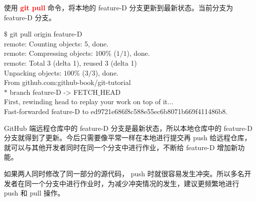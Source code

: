 \documentclass[12pt,a4paper]{article}
\begin{document}
使用  \textcolor{red}{\bf git pull} 命令，将本地的 feature-D 分支更新到最新状态。当前分支为 feature-D 分支。
\begin{tcolorbox}[colback=green!5,colframe=green!40!black,title= ]
$\$$ git pull origin feature-D \\
remote: Counting objects: 5, done. \\
remote: Compressing objects: $100\%$ ($1/1$), done. \\
remote: Total 3 (delta 1), reused 3 (delta 1) \\
Unpacking objects: $100\%$ ($3/3$), done. \\
From github.com:github-book/git-tutorial \\
$\ast$ branch feature-D -> FETCH$\_$HEAD \\
First, rewinding head to replay your work on top of it... \\
Fast-forwarded feature-D to ed9721e686f8c588e55ec6b8071b669f411486b8. 
\end{tcolorbox}

GitHub 端远程仓库中的 feature-D 分支是最新状态，所以本地仓库中的 feature-D 分支就得到了更新。今后只需要像平常一样在本地进行提交再 push 给远程仓库，就可以与其他开发者同时在同一个分支中进行作业，不断给 feature-D 增加新功能。

如果两人同时修改了同一部分的源代码， push 时就很容易发生冲突。所以多名开发者在同一个分支中进行作业时，为减少冲突情况的发生，建议更频繁地进行 push 和 pull 操作。








\end{document}
